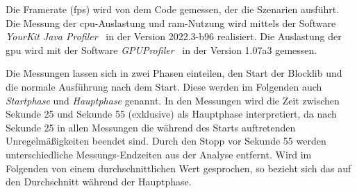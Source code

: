 Die Framerate (\ac{fps}) wird von dem Code gemessen, der die Szenarien ausführt. Die Messung der \ac{cpu}-Auslastung und \ac{ram}-Nutzung wird mittels der Software \emph{YourKit Java Profiler}~\cite{YourKitGmbH} in der Version 2022.3-b96 realisiert. Die Auslastung der \ac{gpu} wird mit der Software \emph{GPUProfiler}~\cite{Main2021} in der Version 1.07a3 gemessen. 

Die Messungen lassen sich in zwei Phasen einteilen, den Start der Blocklib und die normale Ausführung nach dem Start. Diese werden im Folgenden auch \emph{Startphase} und \emph{Hauptphase} genannt. In den Messungen wird die Zeit zwischen Sekunde 25 und Sekunde 55 (exklusive) als Hauptphase interpretiert, da nach Sekunde 25 in allen Messungen die während des Starts auftretenden Unregelmäßigkeiten beendet sind. Durch den Stopp vor Sekunde 55 werden unterschiedliche Messungs-Endzeiten aus der Analyse entfernt. Wird im Folgenden von einem durchschnittlichen Wert gesprochen, so bezieht sich das auf den Durchschnitt während der Hauptphase.